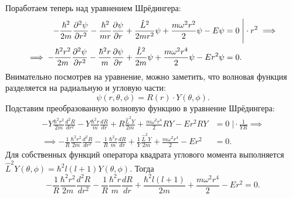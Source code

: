 Поработаем теперь над уравнением Шрёдингера:
\begin{align*}
  -\frac{\hbar^2}{2m}\frac{\partial^2\psi}{\partial r^2} - \frac{\hbar^2}{mr}\frac{\partial \psi}{\partial r} + \frac{\hat{L}^2}{2mr^2}\psi + \frac{m\omega^2 r^2}{2}\psi - E\psi & = 0 \; \Bigg| \cdot r^2 \implies \\
  \implies -\frac{\hbar^2 r^2}{2m}\frac{\partial^2\psi}{\partial r^2} - \frac{\hbar^2 r}{m}\frac{\partial \psi}{\partial r} + \frac{\hat{L}^2}{2m}\psi + \frac{m\omega^2 r^4}{2}\psi - Er^2\psi & = 0.
\end{align*}
Внимательно посмотрев на уравнение, можно заметить, что волновая функция
разделяется на радиальную и угловую части:
\[
  \psi(r, \theta, \phi) = R(r) \cdot Y(\theta, \phi).
\]
Подставим преобразованную волновую функцию в уравнение Шрёдингера:
\begin{align*}
  -Y\frac{\hbar^2 r^2}{2m}\frac{d^2R}{dr^2} - Y\frac{\hbar^2 r}{m}\frac{dR}{dr} + R\frac{\hat{L}^2Y}{2m} + \frac{m\omega^2r^4}{2}RY - Er^2RY &= 0 \; \Bigg| \cdot \frac{1}{YR} \implies \\
  \implies -\frac{1}{R}\frac{\hbar^2 r^2}{2m}\frac{d^2R}{dr^2} - \frac{1}{R}\frac{\hbar^2r}{m}\frac{dR}{dr} + \frac{1}{Y}\frac{\hat{L}^2Y}{2m} + \frac{m\omega^2r^4}{2} - Er^2 &= 0.
\end{align*}
Для собственных функций оператора квадрата углового момента выполняется
$\hat{L}^2Y(\theta, \phi) = \hbar^2l(l+1)Y(\theta, \phi)$. Тогда
\[
  -\frac{1}{R}\frac{\hbar^2 r^2}{2m}\frac{d^2R}{dr^2} - \frac{1}{R}\frac{\hbar^2r}{m}\frac{dR}{dr} + \frac{\hbar^2 l(l+1)}{2m} + \frac{m\omega^2r^4}{2} - Er^2 = 0.
\]

